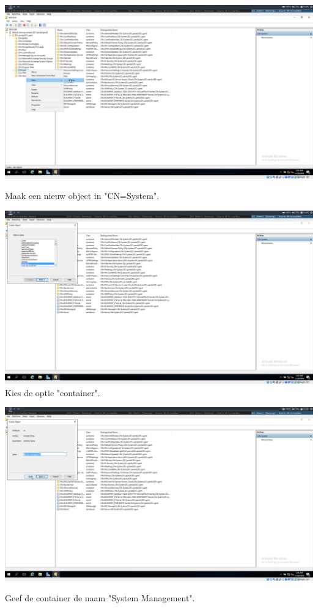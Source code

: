 \documentclass[a4paper]{article}
\begin{document}
\begin{center}
	\includegraphics[width=15cm]{Pictures/SCCM/1/1543499145.png}
	
	Maak een nieuw object in "CN=System".
\end{center}
\begin{center}
	\includegraphics[width=15cm]{Pictures/SCCM/1/1543499150.png}
	Kies de optie "container".
\end{center}
\begin{center}
	\includegraphics[width=15cm]{Pictures/SCCM/1/1543499210.png}
	
	Geef de container de naam "System Management".
\end{center}
\end{document}
